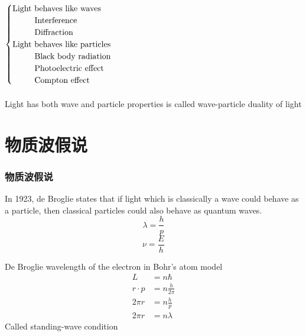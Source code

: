 \begin{frame}  
  $\begin{cases}
    \text{Light behaves like waves }\\
    \text{~~\qquad Interference} \\
    \text{~~\qquad Diffraction} \\
    \text{Light behaves like particles}\\
    \text{~~\qquad Black body radiation} \\
    \text{~~\qquad Photoelectric effect} \\
    \text{~~\qquad Compton effect} \\
   \end{cases}$\\
   ~~\\
   Light has both wave and particle properties is called \alert{wave-particle duality} of light
\end{frame}



\section{物质波假说}

\begin{frame}   
  \frametitle{物质波假说}
  \begin{tcolorbox}[colback=yellow!10,colframe=red!75!black,title=]
  In 1923, de Broglie states that if light which is classically a wave could behave as a particle, 
  then classical particles could also behave as quantum waves.
  \[\lambda=\frac{h}{p}\]
  \[\nu =\frac{E}{h}\]
  \end{tcolorbox}
\end{frame}

\begin{frame}  
    \frame{}
    De Broglie wavelength of the electron in Bohr's atom model
    \begin{equation*}
        \begin{split}
            L&=n\hbar \\
            r \cdot p & =  n\frac{h}{2 \pi} \\
            2\pi r&=  n\frac{h}{p}\\
            2\pi r&=  n\lambda 
        \end{split} 
     \end{equation*}
     Called standing-wave condition 
\end{frame}


